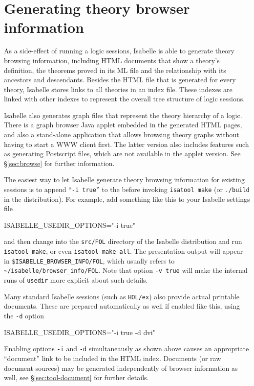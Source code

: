 \section{Generating theory browser information} \label{sec:info}

As a side-effect of running a logic sessions, Isabelle is able to generate
theory browsing information, including HTML documents that show a theory's
definition, the theorems proved in its ML file and the relationship with its
ancestors and descendants.  Besides the HTML file that is generated for every
theory, Isabelle stores links to all theories in an index file. These indexes
are linked with other indexes to represent the overall tree structure of logic
sessions.

Isabelle also generates graph files that represent the theory hierarchy of a
logic.  There is a graph browser Java applet embedded in the generated HTML
pages, and also a stand-alone application that allows browsing theory graphs
without having to start a WWW client first.  The latter version also includes
features such as generating Postscript files, which are not available in the
applet version.  See \S\ref{sec:browse} for further information.

\medskip

The easiest way to let Isabelle generate theory browsing information for
existing sessions is to append ``\texttt{-i true}'' to the
 before invoking \texttt{isatool make} (or
\texttt{./build} in the distribution).  For example, add something like this
to your Isabelle settings file
\begin{ttbox}
ISABELLE_USEDIR_OPTIONS="-i true"
\end{ttbox}
and then change into the \texttt{src/FOL} directory of the Isabelle
distribution and run \texttt{isatool make}, or even \texttt{isatool make all}.
The presentation output will appear in \texttt{\$ISABELLE_BROWSER_INFO/FOL},
which usually refers to \verb,~/isabelle/browser_info/FOL,.  Note that option
\texttt{-v true} will make the internal runs of \texttt{usedir} more explicit
about such details.

Many standard Isabelle sessions (such as \texttt{HOL/ex}) also provide actual
printable documents.  These are prepared automatically as well if enabled like
this, using the \texttt{-d} option
\begin{ttbox}
ISABELLE_USEDIR_OPTIONS="-i true -d dvi"
\end{ttbox}
Enabling options \texttt{-i} and \texttt{-d} simultaneausly as shown above
causes an appropriate ``document'' link to be included in the HTML index.
Documents (or raw document sources) may be generated independently of browser
information as well, see \S\ref{sec:tool-document} for further details.

